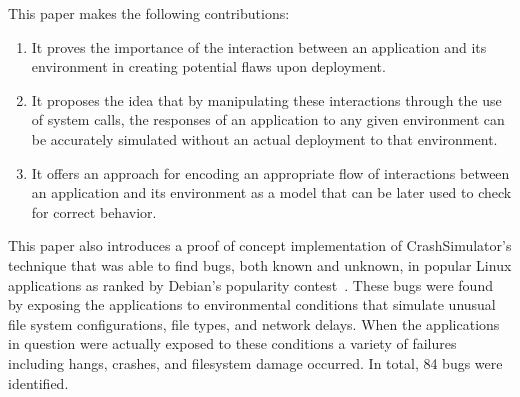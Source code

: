 This paper makes the following contributions:

\begin{enumerate}
\item{It proves the importance of the interaction between an application and
    its environment in creating potential flaws upon deployment.}
\item{It proposes the idea that by manipulating these interactions through
    the use of system calls, the responses of an application to any given
    environment can be accurately simulated without an actual deployment to
    that environment.}
\item{It offers an approach for encoding an appropriate flow of
    interactions between an application and its environment as a model that
    can be later used to check for correct behavior.}
\end{enumerate}

This paper also introduces a proof of concept implementation of CrashSimulator's
technique that was able to find bugs, both known and unknown, in popular Linux
applications as ranked by Debian's popularity contest~\cite{DebPopCon}.  These
bugs were found by exposing the applications to environmental conditions that
simulate unusual file system configurations, file types, and network delays.
When the applications in question were actually exposed to these conditions a
variety of failures including hangs, crashes, and filesystem damage occurred.  In
total, 84 bugs were identified.



